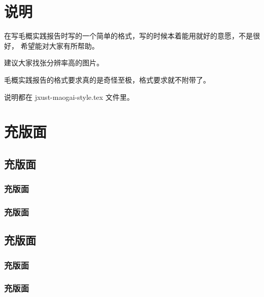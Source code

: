 \documentclass[zihao=-4,a4paper]{ctexart}
\begin{document}
    \maketitle
    \vspace*{4cm}
    \tableofcontents
    \setcounter{page}{1}
    \newpage
    \section{说明}
    
    在写毛概实践报告时写的一个简单的格式，写的时候本着能用就好的意愿，不是很好，
    希望能对大家有所帮助。

    建议大家找张分辨率高的图片。

    毛概实践报告的格式要求真的是奇怪至极，格式要求就不附带了。

    说明都在 jxust-maogai-style.tex 文件里。

    \section{充版面}

    \subsection{充版面}
    
        \subsubsection{充版面}
        \zhlipsum

        \subsubsection{充版面}
        \zhlipsum
    
    \subsection{充版面}
    \zhlipsum
    
        \subsubsection{充版面}
        \zhlipsum

        \subsubsection{充版面}
        \zhlipsum
\end{document}
